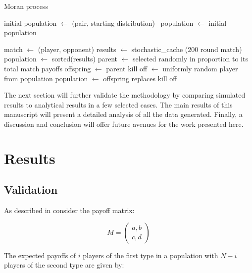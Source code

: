 \documentclass[10pt,letterpaper]{article}
\begin{document}
\begin{algorithm}[!hbtp]
        \caption{Moran process}
        \label{alg:moran_process}
          \begin{algorithmic}[1]
          \STATE initial population $\gets$ (pair, starting distribution) \
          \STATE population $\gets$ initial population

                \STATE match $\gets$ (player, opponent)
                \STATE results $\gets$ stochastic\_cache (200 round match)
                \ENDFOR
              \ENDFOR
              \STATE population $\gets$ sorted(results)
              \STATE parent $\gets$ selected randomly in proportion to its total match payoffs
              \STATE offspring $\gets$ parent
              \STATE kill off $\gets$ uniformly random player from population
              \STATE population $\gets$ offspring replaces kill off
            \ENDWHILE
          \end{algorithmic}
\end{algorithm}

The next section will further validate the methodology by comparing
simulated results to analytical results in a few selected cases. The main
results of this
manuscript will
present a detailed analysis of all the data generated. Finally,
a discussion and conclusion will offer future avenues for the work
presented here.

\section*{Results}

\subsection*{Validation}

As described in \cite{Nowak} consider the payoff matrix:

\begin{equation}\label{equ:payoff_matrix}
    M = \begin{pmatrix}
        a, b\\
        c, d
        \end{pmatrix}
\end{equation}

The expected payoffs of \(i\) players of the first type in a population with \(N
- i\) players of the second type are given by:
\end{document}
